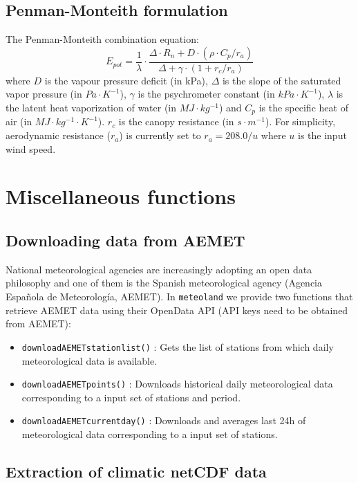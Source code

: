 \documentclass[11pt,a4paper]{article}
\begin{document}
\subsection{Penman-Monteith formulation}
The Penman-Monteith combination equation:
\begin{equation}
E_{pot} = \frac{1}{\lambda} \cdot \frac{\Delta \cdot R_{n} + D \cdot (\rho \cdot C_p/r_a)}{\Delta + \gamma \cdot (1 + r_c/r_a)}
\end{equation}
where  $D$ is the vapour pressure deficit (in kPa), $\Delta$  is the slope of the saturated vapor pressure (in $Pa \cdot K^{-1}$), $\gamma$ is the psychrometer constant (in $kPa\cdot K^{-1}$), $\lambda$ is the latent heat vaporization of water (in $MJ\cdot kg^{-1}$) and $C_p$ is the specific heat of air (in $MJ\cdot kg^{-1}\cdot K^{-1}$). $r_c$ is the canopy resistance (in $s\cdot m^{-1}$). For simplicity, aerodynamic resistance ($r_a$) is currently set to $r_a = 208.0/u$ where $u$ is the input wind speed.  

\section{Miscellaneous functions}
\subsection{Downloading data from AEMET}

National meteorological agencies are increasingly adopting an open data philosophy and one of them is the Spanish meteorological agency (Agencia Española de Meteorología, AEMET). In \texttt{meteoland} we provide two functions that retrieve AEMET data using their OpenData API (API keys need to be obtained from AEMET):
\begin{itemize}
\item{\texttt{downloadAEMETstationlist()} : Gets the list of stations from which daily meteorological data is available.}
\item{\texttt{downloadAEMETpoints()} : Downloads historical daily meteorological data corresponding to a input set of stations and period.}
\item{\texttt{downloadAEMETcurrentday()} : Downloads and averages last 24h of meteorological data corresponding to a input set of stations.}
\end{itemize}


\subsection{Extraction of climatic netCDF data}
\end{document}
